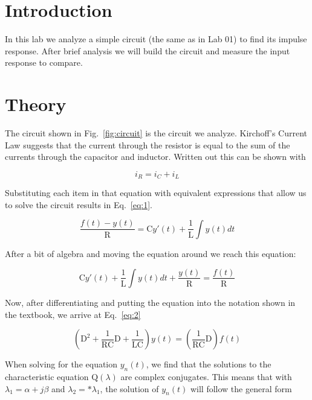 \documentclass[11pt]{texMemo-gibbons}
\begin{document}
\maketitle

\section{Introduction}
\label{sec:introduction}

In this lab we analyze a simple circuit (the same as
in Lab 01) to find its impulse response. After brief
analysis we will build the circuit and measure the input
response to compare.


\section{Theory}
\label{sec:theory}

The circuit shown in Fig.~\ref{fig:circuit} is the circuit
we analyze. Kirchoff's Current Law suggests that the current
through the resistor is equal to the sum of the currents
through the capacitor and inductor. Written out this can be shown
with

\[
  i_R=i_C+i_L
\]

Substituting each item in that equation with equivalent
expressions that allow us to solve the circuit results
in Eq.~\ref{eq:1}.

\begin{equation}
  \label{eq:1}
  \frac{f(t)-y(t)}{\text{R}}=\text{C} y'(t) + \frac{1}{\text{L}} \int y(t)dt
\end{equation}

After a bit of algebra and moving the equation around
we reach this equation:

\[
\text{C} y'(t) + \frac{1}{\text{L}} \int y(t)dt + \frac{y(t)}{\text{R}} = \frac{f(t)}{\text{R}}
\]


Now, after differentiating and putting the equation
into the notation shown in the textbook, we arrive at
Eq.~\ref{eq:2}

\begin{equation}
  \label{eq:2}
  (\text{D}^2 + \frac{1}{\text{RC}} \text{D} + \frac{1}{\text{LC}})y(t) = (\frac{1}{\text{RC}} \text{D})f(t)
\end{equation}

When solving for the equation $y_n(t)$, we find that
the solutions to the characteristic equation $\text{Q}(\lambda)$
are complex conjugates. This means that with $\lambda_1
= \alpha + j\beta$ and $\lambda_2 = * \lambda_1$, the
solution of $y_n(t)$ will follow the general form 
\end{document}
